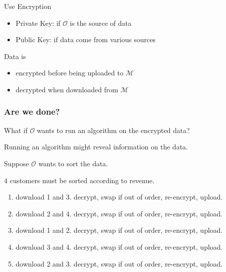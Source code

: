 \documentclass[]{beamer}
\newcommand{\owner}{\mathcal{O}}
\newcommand{\manager}{\mathcal{M}}
\begin{document}
{\begin{frame}
\pause
\vspace{.4cm}

\pause
\begin{block}{Use Encryption}
\begin{itemize}
\item {\color{brown} Private Key:} if $\owner$ is the source of data
\vspace{.3cm}
\item {\color{brown} Public Key:}  if data come from various sources
\end{itemize}
\end{block}

\pause
\vfill
\alert{Data is}


\begin{itemize}[<+->]
\item {\color{blue} encrypted before being uploaded {\color{magenta} to} $\manager$ }
\vspace{.3cm}
\item {\color{blue} decrypted when downloaded {\color{magenta} from} $\manager$}
\end{itemize}
\end{frame}

\begin{frame}
\frametitle{Are we done?}

{\color{magenta} What if $\owner$ wants to run an algorithm on the encrypted data?}

\pause

\vspace{.1cm}
\alert{Running an algorithm might reveal information on the data.}
\pause

\vspace{.2cm}
{\color{cyan} Suppose $\owner$ wants to sort the data.}
\pause

\begin{example}
$4$ customers must be sorted according to revenue.
\pause

\begin{enumerate}[<+->]
\item download 1 and 3. decrypt, swap if out of order, re-encrypt, upload.
\item download 2 and 4. decrypt, swap if out of order, re-encrypt, upload.
\item download 1 and 2. decrypt, swap if out of order, re-encrypt, upload.
\item download 3 and 4. decrypt, swap if out of order, re-encrypt, upload.
\item download 2 and 3. decrypt, swap if out of order, re-encrypt, upload.
\end{enumerate}
\end{example}



\end{frame}}
\end{document}
